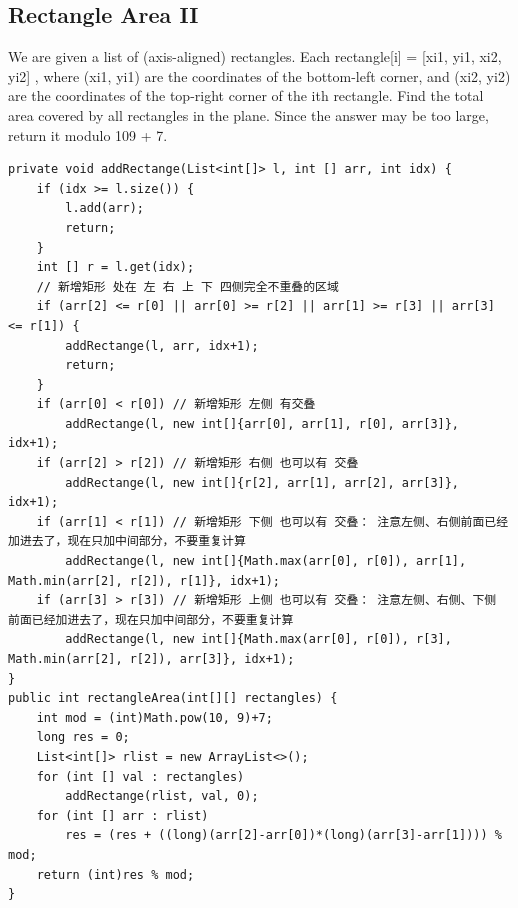 \documentclass[9pt, b5paper]{article}
\begin{document}
\subsection{Rectangle Area II}
\label{sec-17-2}
We are given a list of (axis-aligned) rectangles. Each rectangle[i] = [xi1, yi1, xi2, yi2] , where (xi1, yi1) are the coordinates of the bottom-left corner, and (xi2, yi2) are the coordinates of the top-right corner of the ith rectangle.
Find the total area covered by all rectangles in the plane. Since the answer may be too large, return it modulo 109 + 7.
\begin{verbatim}
private void addRectange(List<int[]> l, int [] arr, int idx) {
    if (idx >= l.size()) {
        l.add(arr);
        return;
    }
    int [] r = l.get(idx);
    // 新增矩形 处在 左 右 上 下 四侧完全不重叠的区域
    if (arr[2] <= r[0] || arr[0] >= r[2] || arr[1] >= r[3] || arr[3] <= r[1]) { 
        addRectange(l, arr, idx+1);
        return;
    }
    if (arr[0] < r[0]) // 新增矩形 左侧 有交叠
        addRectange(l, new int[]{arr[0], arr[1], r[0], arr[3]}, idx+1);
    if (arr[2] > r[2]) // 新增矩形 右侧 也可以有 交叠
        addRectange(l, new int[]{r[2], arr[1], arr[2], arr[3]}, idx+1);
    if (arr[1] < r[1]) // 新增矩形 下侧 也可以有 交叠： 注意左侧、右侧前面已经加进去了，现在只加中间部分，不要重复计算
        addRectange(l, new int[]{Math.max(arr[0], r[0]), arr[1], Math.min(arr[2], r[2]), r[1]}, idx+1);
    if (arr[3] > r[3]) // 新增矩形 上侧 也可以有 交叠： 注意左侧、右侧、下侧 前面已经加进去了，现在只加中间部分，不要重复计算
        addRectange(l, new int[]{Math.max(arr[0], r[0]), r[3], Math.min(arr[2], r[2]), arr[3]}, idx+1);
}
public int rectangleArea(int[][] rectangles) {
    int mod = (int)Math.pow(10, 9)+7;
    long res = 0;
    List<int[]> rlist = new ArrayList<>();
    for (int [] val : rectangles) 
        addRectange(rlist, val, 0);
    for (int [] arr : rlist) 
        res = (res + ((long)(arr[2]-arr[0])*(long)(arr[3]-arr[1]))) % mod;
    return (int)res % mod;
}
\end{verbatim}
\end{document}
